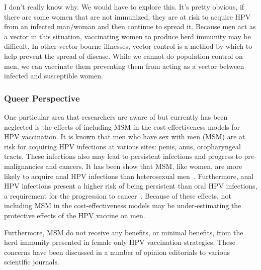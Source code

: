 \documentclass[12pt]{article}
\begin{document}
I don't really know why.  We would have to explore this.  It's pretty obvious, if there are some women that are not immunized, they are at risk to acquire HPV from an infected man/woman and then continue to spread it.  Because men act as a vector in this situation, vaccinating women to produce herd immunity may be difficult.  In other vector-bourne illnesses, vector-control is a method by which to help prevent the spread of disease.  While we cannot do population control on men, we can vaccinate them preventing them from acting as a vector between infected and susceptible women.  

%

\subsubsection*{Queer Perspective}

One particular area that researchers are aware of but currently has been neglected is the effects of including MSM in the cost-effectiveness models for HPV vaccination.  It is known that men who have sex with men (MSM) are at risk for acquiring HPV infections at various sites: penis, anus, oropharyngeal tracts.  These infections also may lead to persistent infections and progress to pre-malignancies and cancers.  It has been show that MSM, like women, are more likely to acquire anal HPV infections than heterosexual men~\cite{Beachler:2013}.  Furthermore, anal HPV infections present a higher risk of being persistent than oral HPV infections, a requirement for the progression to cancer~\cite{Beachler:2013}.  Because of these effects, not including MSM in the cost-effectiveness models may be under-estimating the protective effects of the HPV vaccine on men.  

Furthermore, MSM do not receive any benefits, or minimal benefits, from the herd immunity presented in female only HPV vaccination strategies.  These concerns have been discussed in a number of opinion editorials to various scientific journals. 
\end{document}
